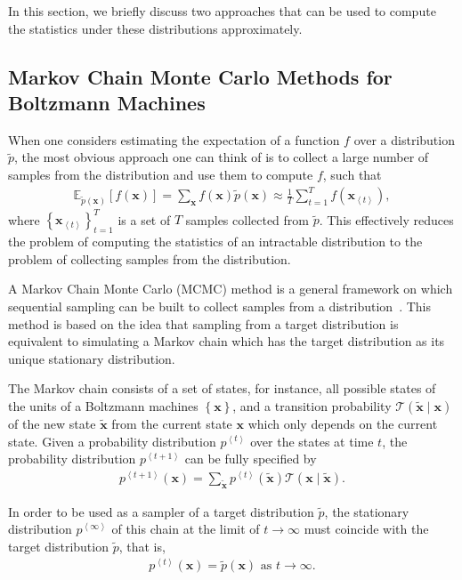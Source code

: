 \documentclass{now}
\newcommand{\qt}[1]{\left<#1\right>}
\newcommand{\vect}[1]{\mathbf{#1}}
\newcommand{\vx}[0]{\vect{x}}
\newcommand{\T}[0]{\mathcal{T}}
\newcommand{\E}[0]{\mathbb{E}}
\begin{document}
In this section, we briefly discuss two approaches that can be used to compute
the statistics under these distributions approximately.

\subsection{Markov Chain Monte Carlo Methods for Boltzmann Machines}
\label{sec:mcmc}

When one considers estimating the expectation of a function $f$ over a
distribution $\tilde{p}$, the most obvious approach one can think of is to
collect a large number of samples from the distribution and use them to compute
$f$, such that
\begin{align*}
    \E_{\tilde{p}(\vx)} \left[ f(\vx) \right] = \sum_{\vx} f(\vx)
    \tilde{p}(\vx) \approx \frac{1}{T} \sum_{t=1}^T
    f(\vx_{\qt{t}}),
\end{align*}
where $\left\{ \vx_{\qt{t}} \right\}_{t=1}^T$ is a set of $T$ samples collected
from $\tilde{p}$. This effectively reduces the problem of computing the
statistics of an intractable distribution to the problem of collecting samples
from the distribution.

A Markov Chain Monte Carlo (MCMC) method is a general framework on which
sequential sampling can be built to collect samples from a
distribution~\citep[see, e.g.,][for comprehensive review on using MCMC sampling
in probabilistic models]{Neal1993,Mackay2002}. This method is based on the idea
that sampling from a target distribution is equivalent to simulating a Markov
chain which has the target distribution as its unique stationary distribution.

The Markov chain consists of a set of states, for instance, all possible states
of the units of a Boltzmann machines $\left\{ \vx \right\}$, and a transition
probability $\T(\tilde{\vx} \mid \vx)$ of the new state $\tilde{\vx}$ from the
current state $\vx$ which only depends on the current state. Given a probability
distribution $p^{\qt{t}}$ over the states at time $t$, the probability
distribution $p^{\qt{t+1}}$ can be fully specified by
\begin{align*}
    p^{\qt{t+1}}(\vx) = \sum_{\tilde{\vx}} p^{\qt{t}}(\tilde{\vx})
    \T(\vx \mid \tilde{\vx}).
\end{align*}

In order to be used as a sampler of a target distribution $\tilde{p}$, the
stationary distribution $p^{\qt{\infty}}$ of this chain at the limit of $t \to
\infty$ must coincide with the target distribution $\tilde{p}$, that is,
\begin{align*}
    p^{\qt{t}}(\vx) = \tilde{p}(\vx)\text{ as }t \to \infty.
\end{align*}
\end{document}
